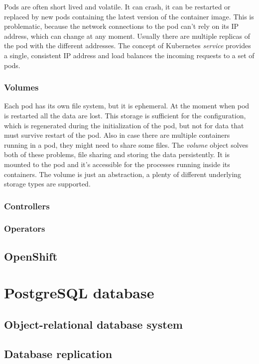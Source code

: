 \documentclass[
  digital, %
  twoside, %
  table,   %
  lof,     %
  lot,     %
]{fithesis3}
\begin{document}
Pods are often short lived and volatile. It can crash, it can be restarted or replaced by new pods containing the latest version of the container image. This is problematic, because the network connections to the pod can't rely on its IP address, which can change at any moment. Usually there are multiple replicas of the pod with the different addresses. The concept of Kubernetes \textit{service} provides a single, consistent IP address and load balances the incoming requests to a set of pods.

\subsection{Volumes}
Each pod has its own file system, but it is ephemeral. At the moment when pod is restarted all the data are lost. This storage is sufficient for the configuration, which is regenerated during the initialization of the pod, but not for data that must survive restart of the pod. Also in case there are multiple containers running in a pod, they might need to share some files. The \textit{volume} object solves both of these problems, file sharing and storing the data persistently. It is mounted to the pod and it's accessible for the processes running inside its containers. The volume is just an abstraction, a plenty of different underlying storage types are supported.

\subsection{Controllers}
\subsection{Operators}

\section{OpenShift}
\chapter{PostgreSQL database}
\section{Object-relational database system}
\section{Database replication}
\end{document}
